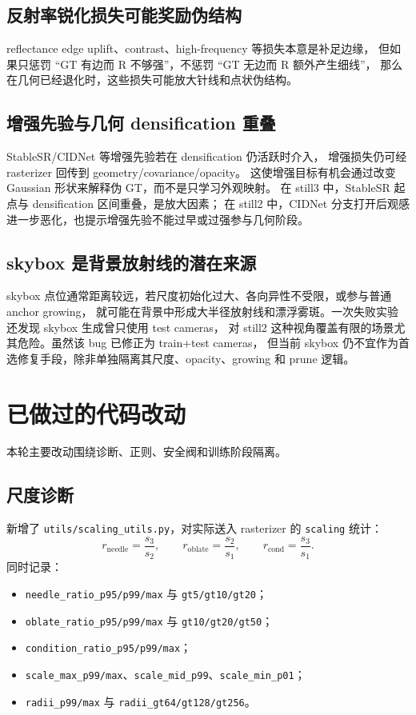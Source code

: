 \documentclass[11pt,a4paper]{article}
\begin{document}
\subsection{反射率锐化损失可能奖励伪结构}

reflectance edge uplift、contrast、high-frequency 等损失本意是补足边缘，
但如果只惩罚 ``GT 有边而 R 不够强''，不惩罚 ``GT 无边而 R 额外产生细线''，
那么在几何已经退化时，这些损失可能放大针线和点状伪结构。

\subsection{增强先验与几何 densification 重叠}

StableSR/CIDNet 等增强先验若在 densification 仍活跃时介入，
增强损失仍可经 rasterizer 回传到 geometry/covariance/opacity。
这使增强目标有机会通过改变 Gaussian 形状来解释伪 GT，而不是只学习外观映射。
在 still3 中，StableSR 起点与 densification 区间重叠，是放大因素；
在 still2 中，CIDNet 分支打开后观感进一步恶化，也提示增强先验不能过早或过强参与几何阶段。

\subsection{skybox 是背景放射线的潜在来源}

skybox 点位通常距离较远，若尺度初始化过大、各向异性不受限，或参与普通 anchor growing，
就可能在背景中形成大半径放射线和漂浮雾斑。一次失败实验还发现 skybox 生成曾只使用 test cameras，
对 still2 这种视角覆盖有限的场景尤其危险。虽然该 bug 已修正为 train+test cameras，
但当前 skybox 仍不宜作为首选修复手段，除非单独隔离其尺度、opacity、growing 和 prune 逻辑。

\section{已做过的代码改动}

本轮主要改动围绕诊断、正则、安全阀和训练阶段隔离。

\subsection{尺度诊断}

新增了 \texttt{utils/scaling\_utils.py}，对实际送入 rasterizer 的 \texttt{scaling} 统计：
\[
  r_{\text{needle}} = \frac{s_3}{s_2}, \qquad
  r_{\text{oblate}} = \frac{s_2}{s_1}, \qquad
  r_{\text{cond}} = \frac{s_3}{s_1}.
\]
同时记录：
\begin{itemize}[leftmargin=1.5em]
  \item \texttt{needle\_ratio\_p95/p99/max} 与 \texttt{gt5/gt10/gt20}；
  \item \texttt{oblate\_ratio\_p95/p99/max} 与 \texttt{gt10/gt20/gt50}；
  \item \texttt{condition\_ratio\_p95/p99/max}；
  \item \texttt{scale\_max\_p99/max}、\texttt{scale\_mid\_p99}、\texttt{scale\_min\_p01}；
  \item \texttt{radii\_p99/max} 与 \texttt{radii\_gt64/gt128/gt256}。
\end{itemize}
\end{document}
